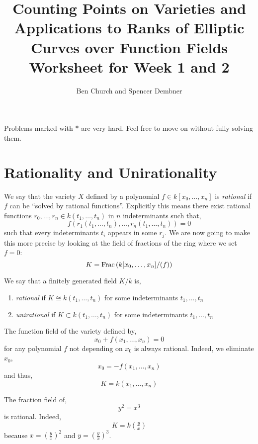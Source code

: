 \documentclass[12pt]{article}
\begin{document}
\title{Counting Points on Varieties and Applications to Ranks of Elliptic Curves over Function Fields \bigskip\\
\Large Worksheet for Week 1 and 2}

\author{Ben Church and Spencer Dembner}

\maketitle 

Problems marked with $*$ are very hard. Feel free to move on without fully solving them. 

\section{Rationality and Unirationality}

\newcommand{\lcm}{\mathrm{lcm}}

We say that the variety $X$ defined by a polynomial $f \in k[x_0, \dots, x_n]$ is \textit{rational} if $f$ can be ``solved by rational functions''. Explicitly this means there exist rational functions $r_0, \dots, r_n \in k(t_1, \dots, t_n)$ in $n$ indeterminants such that,
\[ f(r_1(t_1, \dots, t_n), \dots, r_n(t_1, \dots, t_n)) = 0 \]
such that every indeterminants $t_i$ appears in some $r_j$. We are now going to make this more precise by looking at the field of fractions of the ring where we set $f = 0$:
\[ K = \mathrm{Frac}\left(k[x_0, \dots, x_n]/(f)\right) \]

\begin{defn}
We say that a finitely generated field $K / k$ is,
\begin{enumerate}
\item \textit{rational} if $K \cong k(t_1, \dots, t_n)$ for some indeterminants $t_1, \dots, t_n$

\item \textit{unirational} if $K \subset k(t_1, \dots, t_n)$ for some indeterminants $t_1, \dots, t_n$
\end{enumerate}
\end{defn}

\begin{example}
The function field of the variety defined by,
\[ x_0 + f(x_1, \dots, x_n) = 0 \]
for any polynomial $f$ not depending on $x_0$ is always rational. Indeed, we eliminate $x_0$,
\[ x_0 = - f(x_1, \dots, x_n) \]
and thus,
\[ K = k(x_1, \dots, x_n) \]
\end{example}

\begin{example}
The fraction field of,
\[ y^2 = x^3 \]
is rational. Indeed,
\[ K = k(\tfrac{y}{x}) \]
because $x = (\tfrac{y}{x})^2$ and $y = (\tfrac{y}{x})^3$. 
\end{example}
\end{document}
